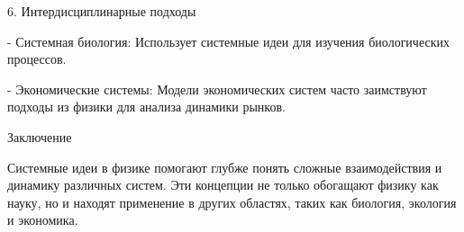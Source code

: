 \documentclass[exam_answers.tex]{subfiles}
\begin{document}
6. Интердисциплинарные подходы

- Системная биология: Использует системные идеи для изучения биологических процессов.

- Экономические системы: Модели экономических систем часто заимствуют подходы из физики для анализа динамики рынков.

Заключение

Системные идеи в физике помогают глубже понять сложные взаимодействия и динамику различных систем. Эти концепции не только обогащают физику как науку, но и находят применение в других областях, таких как биология, экология и экономика.
\end{document}
